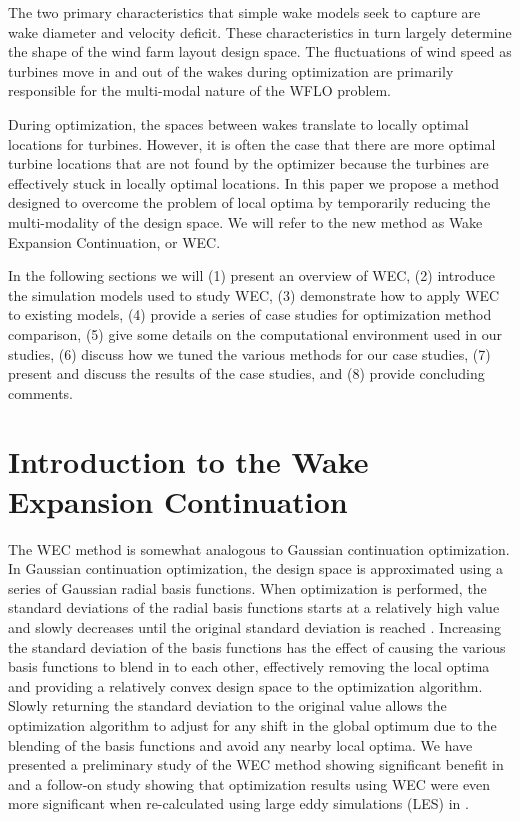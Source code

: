 \documentclass{jpconf}
\begin{document}
The two primary characteristics that simple wake models seek to capture are wake diameter and velocity deficit. These characteristics in turn largely determine the shape of the wind farm layout design space. The fluctuations of wind speed as turbines move in and out of the wakes during optimization are primarily responsible for the multi-modal nature of the WFLO problem. 

During optimization, the spaces between wakes translate to locally optimal locations for turbines. However, it is often the case that there are more optimal turbine locations that are not found by the optimizer because the turbines are effectively stuck in locally optimal locations. In this paper we propose a method designed to overcome the problem of local optima by temporarily reducing the multi-modality of the design space. We will refer to the new method as Wake Expansion Continuation, or WEC. 

In the following sections we will (1) present an overview of WEC, (2) introduce the simulation models used to study WEC, (3) demonstrate how to apply WEC to existing models, (4) provide a series of case studies for optimization method comparison, (5) give some details on the computational environment used in our studies, (6) discuss how we tuned the various methods for our case studies, (7) present and discuss the results of the case studies, and (8) provide concluding comments.

\section{Introduction to the Wake Expansion Continuation}\label{sec:introwec}

The WEC method is somewhat analogous to Gaussian continuation optimization. In Gaussian continuation optimization, the design space is approximated using a series of Gaussian radial basis functions. When optimization is performed, the standard deviations of the radial basis functions starts at a relatively high value and slowly decreases until the original standard deviation is reached \cite{mobahi2015}. Increasing the standard deviation of the basis functions has the effect of causing the various basis functions to blend in to each other, effectively removing the local optima and providing a relatively convex design space to the optimization algorithm. Slowly returning the standard deviation to the original value allows the optimization algorithm to adjust for any shift in the global optimum due to the blending of the basis functions and avoid any nearby local optima. We have presented a preliminary study of the WEC method showing significant benefit in \cite{thomas2018-wec} and a follow-on study showing that optimization results using WEC were even more significant when re-calculated using large eddy simulations (LES) in \cite{thomas2019-les-validation}.
\end{document}
